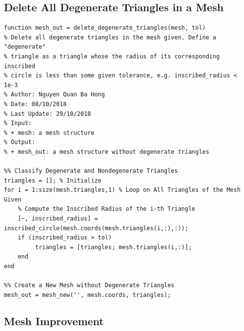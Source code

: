 \documentclass[11pt,a4paper,center,notitlepage]{article}
\numberwithin{equation}{section}
\begin{document}
\subsection{Delete All Degenerate Triangles in a Mesh}
\begin{verbatim}
function mesh_out = delete_degenerate_triangles(mesh, tol)
% Delete all degenerate triangles in the mesh given. Define a "degenerate"
% triangle as a triangle whose the radius of its corresponding inscribed
% circle is less than some given tolerance, e.g. inscribed_radius < 1e-3
% Author: Nguyen Quan Ba Hong
% Date: 08/10/2018
% Last Update: 29/10/2018
% Input:
% + mesh: a mesh structure
% Output:
% + mesh_out: a mesh structure without degenerate triangles 

%% Classify Degenerate and Nondegenerate Triangles
triangles = []; % Initialize
for i = 1:size(mesh.triangles,1) % Loop on All Triangles of the Mesh Given
    % Compute the Inscribed Radius of the i-th Triangle
    [~, inscribed_radius] = inscribed_circle(mesh.coords(mesh.triangles(i,:),:));
    if (inscribed_radius > tol) 
         triangles = [triangles; mesh.triangles(i,:)];
    end
end

%% Create a New Mesh without Degenerate Triangles
mesh_out = mesh_new('', mesh.coords, triangles);
\end{verbatim}
\subsection{Mesh Improvement}
\end{document}
